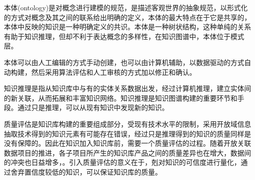\documentclass[11pt]{article}
\begin{document}
	本体(ontology)是对概念进行建模的规范，是描述客观世界的抽象规范，以形式化的方式对概念及其之间的联系给出明确的定义，本体的最大特点在于它是共享的，本体中反映的知识是一种明确定义的共识。本体是一种树状结构，这种单纯的关系有助于知识推理，但却不利于表达概念的多样性，在知识图谱中，本体位于模式层。
	
	本体可以由人工编辑的方式手动创建，也可以由计算机辅助，以数据驱动的方式自动构建，然后采用算法评估和人工审核的方式加以修正和确认。
	
	知识推理是指从知识库中与有的实体关系数据出发，经过计算机推理，建立实体间的新关联，从而拓展和丰富知识网络。知识推理是知识图谱构建的重要环节和手段。通过只是推理，可以从现有知识中发现新的知识。
	
	质量评估是知识库构建的重要组成部分，受现有技术水平的限制，采用开放域信息抽取技术得到的知识元素有可能存在错误，经过只是推理得到的知识的质量同样是没有保障的。因此在知识加入知识库前，需要一个质量评估的过程。随着开放关联数据项目的推进，各子项目所产生的知识库产品之间的质量差异也在增大，数据间的冲突也日益增多，。引入质量评估的意义在于，剋对知识的可信度进行量化，通过舍弃置信度较低的知识，可以保证知识库的质量。

	



	

		
\end{document}
